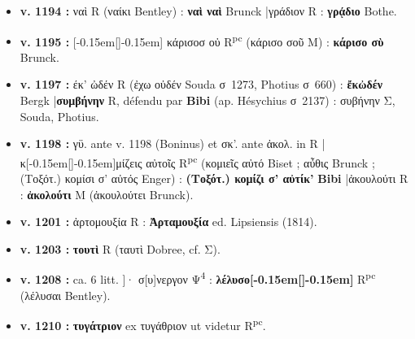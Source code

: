 \documentclass[10pt, a4paper, twoside]{book}
\renewcommand{\_}{\origunderscore\penalty0\relax}
\providecommand{\lecon}[1]{\textbf{#1}}
\providecommand{\expo}[1]{\textsuperscript{#1}}
\providecommand{\Rpc}{R\expo{pc}}
\providecommand{\Mon}{M}
\providecommand{\PsiQuatre}{\textgreek{Ψ}\textsuperscript{4}}
\providecommand{\espApp}{\hspace{0.5em}|\hspace{0.5em}}
\providecommand{\inRas}[2]{[\kern-0.15em[\text{#1}]\kern-0.15em]\text{#2}}
\begin{document}
\begin{itemize}
\begin{itemize}
    \item \textbf{v. 1194 :} ναὶ R (ναίκι Bentley) : \lecon{ναὶ ναὶ} Brunck \espApp γράδιον R : \lecon{γρᾴδιο} Bothe.
    \item \textbf{v. 1195 :} \inRas{σὺ}{} κάρισοσ οὐ \Rpc{} (κάρισο σοῦ \Mon{}) : \lecon{κάρισο σὺ} Brunck.
    \item \textbf{v. 1197 :} έκ' ὠδέν R (ἐχω οὐδέν Souda σ~1273, Photius σ~660) : \lecon{ἔκὠδέν} Bergk \espApp \lecon{συμβήνην} R, défendu par \lecon{Bibi} (ap. Hésychius σ~2137) : συβήνην Σ, Souda, Photius.
    \item \textbf{v. 1198 :} γϋ. ante v. 1198 (Boninus) et σκ'. ante ἀκολ. in R \espApp κ\inRas{ω}{ο}μίζεις αὐτοῖς \Rpc{} (κομιεῖς αὐτό Biset ; αὖθις Brunck ; (Τοξότ.) κομίσι σ' αὐτός Enger) : \lecon{(Τοξότ.) κομίζι σ' αὐτίκ'} \lecon{Bibi} \espApp ἀκουλούτι R : \lecon{ἀκολούτι} \Mon{} (ἀκουλούτει Brunck).
    \item \textbf{v. 1201 :} ἀρτομουξία R : \lecon{Ἀρταμουξία} ed. Lipsiensis (1814).
    \item \textbf{v. 1203 :} \lecon{τουτὶ} R (ταυτὶ Dobree, cf. Σ).
    \item \textbf{v. 1208 :} ca. 6 litt. ]· σ[υ]νεργον \PsiQuatre{} : \lecon{λέλυσο\inRas{ν}{}} \Rpc{} (λέλυσαι Bentley).
    \item \textbf{v. 1210 :} \lecon{τυγάτριον} ex τυγάθριον ut videtur \Rpc{}.
  \end{itemize}
\end{itemize}
\end{document}
